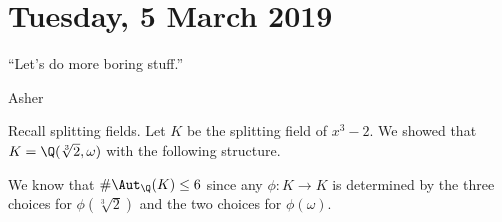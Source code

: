 
\section{Tuesday, 5 March 2019}

\epigraph{``Let's do more boring stuff.''}{Asher}

Recall splitting fields. Let $K$ be the splitting field of $x^3 - 2$. We showed that $K = \Q(\sqrt[3]{2}, \omega)$ with the following structure.


We know that $\#\Aut_\Q(K) \leq 6$ since any $\phi\colon K \to K$ is determined by the three choices for $\phi(\sqrt[3]{2})$ and the two choices for $\phi(\omega)$.

